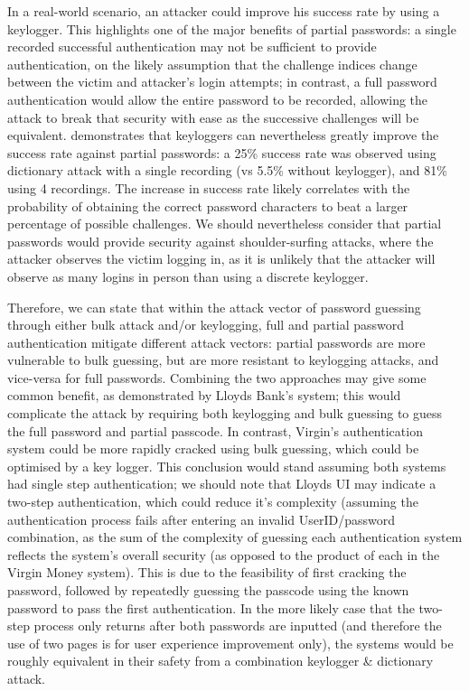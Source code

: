 \documentclass[british,11pt,a4paper]{article}
\begin{document}
In a real-world scenario, an attacker could improve his success rate by using a keylogger. This highlights one of the major benefits of partial passwords: a single recorded successful authentication may not be sufficient to provide authentication, on the likely assumption that the challenge indices change between the victim and attacker's login attempts; in contrast, a full password authentication would allow the entire password to be recorded, allowing the attack to break that security with ease as the successive challenges will be equivalent. \citet{Aspinall2013-sh} demonstrates that keyloggers can nevertheless greatly improve the success rate against partial passwords: a 25\% success rate was observed using dictionary attack with a single recording (vs 5.5\% without keylogger), and 81\% using 4 recordings. The increase in success rate likely correlates with the probability of obtaining the correct password characters to beat a larger percentage of possible challenges. We should nevertheless consider that partial passwords would provide security against shoulder-surfing attacks, where the attacker observes the victim logging in, as it is unlikely that the attacker will observe as many logins in person than using a discrete keylogger. 

Therefore, we can state that within the attack vector of password guessing through either bulk attack and/or keylogging, full and partial password authentication mitigate different attack vectors: partial passwords are more vulnerable to bulk guessing, but are more resistant to keylogging attacks, and vice-versa for full passwords. Combining the two approaches may give some common benefit, as demonstrated by Lloyds Bank's system; this would complicate the attack by requiring both keylogging and bulk guessing to guess the full password and partial passcode. In contrast, Virgin's authentication system could be more rapidly cracked using bulk guessing, which could be optimised by a key logger. This conclusion would stand assuming both systems had single step authentication; we should note that Lloyds UI may indicate a two-step authentication, which could reduce it's complexity (assuming the authentication process fails after entering an invalid UserID/password combination, as the sum of the complexity of guessing each authentication system reflects the system's overall security (as opposed to the product of each in the Virgin Money system). This is due to the feasibility of first cracking the password, followed by repeatedly guessing the passcode using the known password to pass the first authentication. In the more likely case that the two-step process only returns after both passwords are inputted (and therefore the use of two pages is for user experience improvement only), the systems would be roughly equivalent in their safety from a combination keylogger \& dictionary attack.
\end{document}

